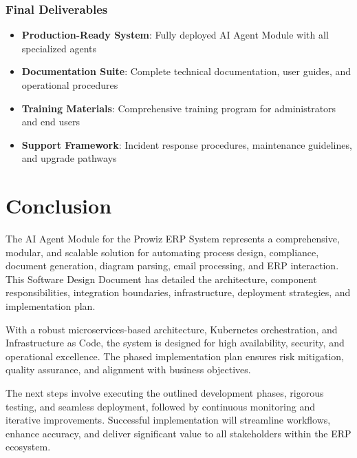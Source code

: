 \documentclass[12pt]{report}
\begin{document}
\subsection{Final Deliverables}
\begin{itemize}
  \item \textbf{Production-Ready System}: Fully deployed AI Agent Module with all specialized agents
  \item \textbf{Documentation Suite}: Complete technical documentation, user guides, and operational procedures
  \item \textbf{Training Materials}: Comprehensive training program for administrators and end users
  \item \textbf{Support Framework}: Incident response procedures, maintenance guidelines, and upgrade pathways
\end{itemize}


\chapter{Conclusion}
The AI Agent Module for the Prowiz ERP System represents a comprehensive, modular, and scalable solution for automating process design, compliance, document generation, diagram parsing, email processing, and ERP interaction. This Software Design Document has detailed the architecture, component responsibilities, integration boundaries, infrastructure, deployment strategies, and implementation plan.

With a robust microservices-based architecture, Kubernetes orchestration, and Infrastructure as Code, the system is designed for high availability, security, and operational excellence. The phased implementation plan ensures risk mitigation, quality assurance, and alignment with business objectives.

The next steps involve executing the outlined development phases, rigorous testing, and seamless deployment, followed by continuous monitoring and iterative improvements. Successful implementation will streamline workflows, enhance accuracy, and deliver significant value to all stakeholders within the ERP ecosystem.

\appendix
\end{document}
